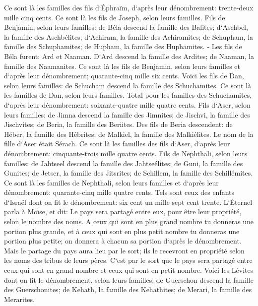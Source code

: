 \verse Ce sont là les familles des fils d`Éphraïm, d`après leur dénombrement: trente-deux mille cinq cents. Ce sont là les fils de Joseph, selon leurs familles. 
\verse Fils de Benjamin, selon leurs familles: de Béla descend la famille des Balites; d`Aschbel, la famille des Aschbélites; d`Achiram, la famille des Achiramites; 
\verse de Schupham, la famille des Schuphamites; de Hupham, la famille des Huphamites. - 
\verse Les fils de Béla furent: Ard et Naaman. D`Ard descend la famille des Ardites; de Naaman, la famille des Naamanites. 
\verse Ce sont là les fils de Benjamin, selon leurs familles et d`après leur dénombrement; quarante-cinq mille six cents. 
\verse Voici les fils de Dan, selon leurs familles: de Schucham descend la famille des Schuchamites. Ce sont là les familles de Dan, selon leurs familles. 
\verse Total pour les familles des Schuchamites, d`après leur dénombrement: soixante-quatre mille quatre cents. 
\verse Fils d`Aser, selon leurs familles: de Jimna descend la famille des Jimnites; de Jischvi, la famille des Jischvites; de Beria, la famille des Beriites. 
\verse Des fils de Beria descendent: de Héber, la famille des Hébrites; de Malkiel, la famille des Malkiélites. 
\verse Le nom de la fille d`Aser était Sérach. 
\verse Ce sont là les familles des fils d`Aser, d`après leur dénombrement: cinquante-trois mille quatre cents. 
\verse Fils de Nephthali, selon leurs familles: de Jahtseel descend la famille des Jahtseélites; de Guni, la famille des Gunites; 
\verse de Jetser, la famille des Jitsrites; de Schillem, la famille des Schillémites. 
\verse Ce sont là les familles de Nephthali, selon leurs familles et d`après leur dénombrement: quarante-cinq mille quatre cents. 
\verse Tels sont ceux des enfants d`Israël dont on fit le dénombrement: six cent un mille sept cent trente. 
\verse L`Éternel parla à Moïse, et dit: 
\verse Le pays sera partagé entre eux, pour être leur propriété, selon le nombre des noms. 
\verse A ceux qui sont en plus grand nombre tu donneras une portion plus grande, et à ceux qui sont en plus petit nombre tu donneras une portion plus petite; on donnera à chacun sa portion d`après le dénombrement. 
\verse Mais le partage du pays aura lieu par le sort; ils le recevront en propriété selon les noms des tribus de leurs pères. 
\verse C`est par le sort que le pays sera partagé entre ceux qui sont en grand nombre et ceux qui sont en petit nombre. 
\verse Voici les Lévites dont on fit le dénombrement, selon leurs familles: de Guerschon descend la famille des Guerschonites; de Kehath, la famille des Kehathites; de Merari, la famille des Merarites. 
